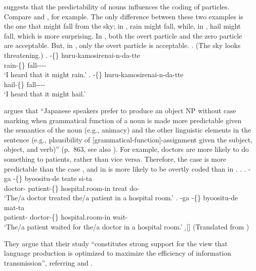  suggests that
the predictability of nouns influences the coding of particles.
Compare \Next[a] and \Next[b], for example.
The only difference between these two examples is the one that
might fall from the sky;
in \Next[a], rain might fall,
while, in \Next[b], hail might fall,
which is more surprising.
In \Next[a], both the overt particle  and the zero particle
are acceptable.
But, in \Next[b], only the overt particle is acceptable.
%
\ex. (The sky looks threatening.)
 \ag. -\{\} huru-kamosirenai-n-da-tte \\
      rain-\{\} fall---- \\
      `I heard that it might rain.'
 \bg. -\{\} huru-kamosirenai-n-da-tte \\
      hail-\{\} fall---- \\
      `I heard that it might hail.'
      \hfill{\cite[290]{niwa06}}

 argues that
``Japanese speakers prefer to produce an object NP without case marking
when grammatical function of a noun is made more predictable
given the semantics of the noun (e.g., animacy) and
the other linguistic elements in the sentence
(e.g., plausibility of [grammatical-function]-assignment given the subject, object, and verb)'' (p.~863, see also ).
For example,
doctors are more likely to do something to patients,
rather than vice versa.
Therefore, the case \Next[a] is more predictable than the case \Next[b],
and  in \Next[b] is more likely to be overtly coded than
 in \Next[a].
%
\ex.
 \ag. -ga -\{\} byoositu-de teate si-ta \\
      doctor- patient-\{\} hospital.room-in treat do- \\
      `The/a doctor treated the/a patient in a hospital room.'
 \bg. -ga -\{\} byoositu-de mat-ta \\
      patient- doctor-\{\} hospital.room-in wait- \\
      `The/a patient waited for the/a doctor in a hospital room.'
  \b.[]    \hfill{(Translated from )}

They argue that their study
``constitutes strong support for the view that
language production is optimized to maximize the efficiency of information transmission'',
referring  and .


